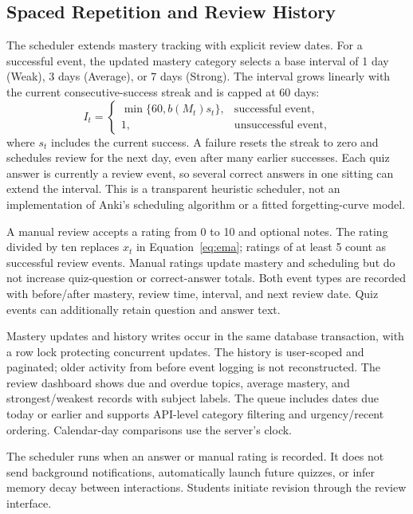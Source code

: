 \documentclass[11pt, a4paper, oneside]{report}
\begin{document}
\subsection{Spaced Repetition and Review History}
\label{sec:srs}
The scheduler extends mastery tracking with explicit review dates. For a successful event, the updated mastery category selects a base interval of 1 day (Weak), 3 days (Average), or 7 days (Strong). The interval grows linearly with the current consecutive-success streak and is capped at 60 days:
\begin{equation}
 I_t=\begin{cases}
 \min\{60,b(M_t)s_t\}, & \text{successful event},\\
 1, & \text{unsuccessful event},
 \end{cases}
 \label{eq:review_interval}
\end{equation}
where $s_t$ includes the current success. A failure resets the streak to zero and schedules review for the next day, even after many earlier successes. Each quiz answer is currently a review event, so several correct answers in one sitting can extend the interval. This is a transparent heuristic scheduler, not an implementation of Anki's scheduling algorithm or a fitted forgetting-curve model.

A manual review accepts a rating from 0 to 10 and optional notes. The rating divided by ten replaces $x_t$ in Equation~\ref{eq:ema}; ratings of at least 5 count as successful review events. Manual ratings update mastery and scheduling but do not increase quiz-question or correct-answer totals. Both event types are recorded with before/after mastery, review time, interval, and next review date. Quiz events can additionally retain question and answer text.

Mastery updates and history writes occur in the same database transaction, with a row lock protecting concurrent updates. The history is user-scoped and paginated; older activity from before event logging is not reconstructed. The review dashboard shows due and overdue topics, average mastery, and strongest/weakest records with subject labels. The queue includes dates due today or earlier and supports API-level category filtering and urgency/recent ordering. Calendar-day comparisons use the server's clock.

The scheduler runs when an answer or manual rating is recorded. It does not send background notifications, automatically launch future quizzes, or infer memory decay between interactions. Students initiate revision through the review interface.
\end{document}
